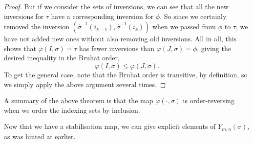 \begin{proof}
  But if we consider the sets of inversions, we can see that all the
  new inversions for $\tau$ have a corresponding inversion for
  $\phi$. So since we certainly removed the inversion
  $(\widehat{\sigma}^{-1}(i_{k-1}),\widehat{\sigma}^{-1}(i_{k}))$ when
  we passed from $\phi$ to $\tau$, we have not added new ones without
  also removing old inversions. All in all, this shows that
  $\varphi(I,\sigma) = \tau$ has fewer inversions than
  $\varphi(J,\sigma) = \phi$, giving the desired inequality in the
  Bruhat order,
  \[ \varphi(I,\sigma) \leq \varphi(J,\sigma). \]
  To get the general case, note that the Bruhat order is transitive,
  by definition, so we simply apply the above argument several times.
\end{proof}

A summary of the above theorem is that the map $\varphi(\cdot,\sigma)$
is order-reversing when we order the indexing sets by inclusion.

Now that we have a stabilisation map, we can give explicit elements of
$Y_{m,n}(\sigma)$, as was hinted at earlier.

